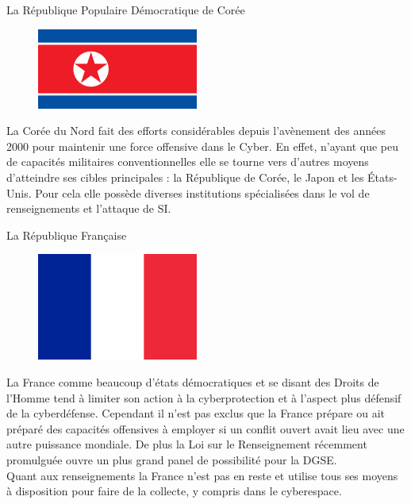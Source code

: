 \documentclass{beamer}
\begin{document}
\begin{frame}{La République Populaire Démocratique de Corée}

    \begin{figure}[h]
        \includegraphics[scale=0.2]{Flag_of_North_Korea}
    \end{figure} 

La Corée du Nord fait des efforts considérables depuis l'avènement des années 2000 pour maintenir une force offensive dans le Cyber. En effet, n'ayant que peu de capacités militaires conventionnelles elle se tourne vers d'autres moyens d'atteindre ses cibles principales : la République de Corée, le Japon et les États-Unis. Pour cela elle possède diverses institutions spécialisées dans le vol de renseignements et l'attaque de SI.


\end{frame}

\begin{frame}{La République Française}

    \begin{figure}[h]
        \includegraphics[scale=0.2]{Flag_of_France}
    \end{figure} 

La France comme beaucoup d'états démocratiques et se disant des Droits de l'Homme tend à limiter son action à la cyberprotection et à l'aspect plus défensif de la cyberdéfense. Cependant il n'est pas exclus que la France prépare ou ait préparé des capacités offensives à employer si un conflit ouvert avait lieu avec une autre puissance mondiale. De plus la Loi sur le Renseignement récemment promulguée ouvre un plus grand panel de possibilité pour la DGSE.\\
Quant aux renseignements la France n'est pas en reste et utilise tous ses moyens à disposition pour faire de la collecte, y compris dans le cyberespace. 

\end{frame}
\end{document}
